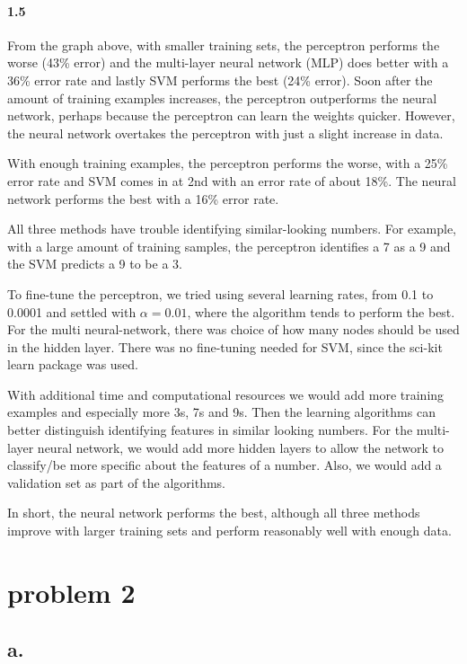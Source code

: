 \documentclass[12pt, letterpaper]{article}
\begin{document}
	
	\paragraph{1.5\newline}
	From the graph above, with smaller training sets, the perceptron performs the worse (43\% error) and the multi-layer neural network (MLP) does better with a 36\% error rate and lastly SVM performs the best (24\% error). Soon after the amount of training examples increases, the perceptron outperforms the neural network, perhaps because the perceptron can learn the weights quicker. However, the neural network overtakes the perceptron with just a slight increase in data.
	
	With enough training examples, the perceptron performs the worse, with a 25\% error rate and SVM comes in at 2nd with an error rate of about 18\%. The neural network performs the best with a 16\% error rate.

	
	All three methods have trouble identifying similar-looking numbers. For example, with a large amount of training samples, the perceptron identifies a 7 as a 9 and the SVM predicts a 9 to be a 3.
	
	To fine-tune the perceptron, we tried using several learning rates, from 0.1 to 0.0001 and settled with $\alpha = 0.01$, where the algorithm tends to perform the best. For the multi neural-network, there was choice of how many nodes should be used in the hidden layer. There was no fine-tuning needed for SVM, since the sci-kit learn package was used.
	
	With additional time and computational resources we would add more training examples and especially more 3s, 7s and 9s. Then the learning algorithms can better distinguish identifying features in similar looking numbers. For the multi-layer neural network, we would add more hidden layers to allow the network to classify/be more specific about the features of a number. Also, we would add a validation set as part of the algorithms.
			
	In short, the neural network performs the best, although all three methods improve with larger training sets and perform reasonably well with enough data.
	
	\pagebreak
	\section{problem 2}
	\subsection{a.}
	
\end{document}
